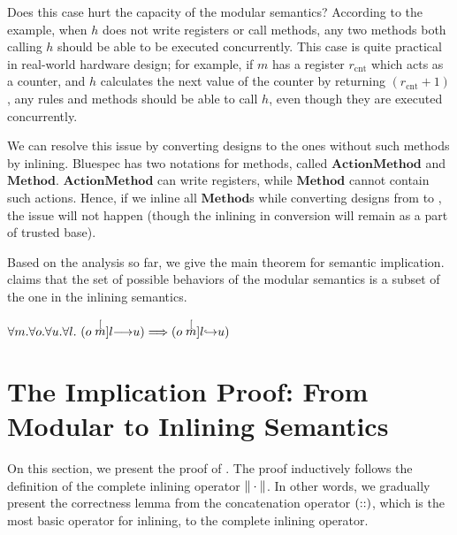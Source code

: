 Does this case hurt the capacity of the modular semantics? According
to the example, when $h$ does not write registers or call methods, any
two methods both calling $h$ should be able to be executed
concurrently. This case is quite practical in real-world hardware
design; for example, if $m$ has a register $r_{\textrm{cnt}}$ which
acts as a counter, and $h$ calculates the next value of the counter by
returning $(r_{\textrm{cnt}} + 1)$, any rules and methods should be
able to call $h$, even though they are executed concurrently.

We can resolve this issue by converting designs to the ones without
such methods by inlining. Bluespec has two notations for methods,
called $\textbf{ActionMethod}$ and
$\textbf{Method}$. $\textbf{ActionMethod}$ can write registers, while
$\textbf{Method}$ cannot contain such actions. Hence, if we inline all
$\textbf{Method}$s while converting designs from \Bluespec{} to
\Kami{}, the issue will not happen (though the inlining in conversion
will remain as a part of trusted base).

Based on the analysis so far, we give the main theorem for semantic
implication.  claims that the set of possible
behaviors of the modular semantics is a subset of the one in the
inlining semantics.

\begin{theorem}
  \label{thm-modtoinl}
  \mbox{}
  \begin{center}
    \begin{math}
      \forall m.\forall o.\forall u.\forall l.\ 
      (\semstep{m}{o}{u}{l}) \Longrightarrow (\semstepin{m}{o}{u}{l})
    \end{math}
  \end{center}
\end{theorem}

\section{The Implication Proof: From Modular to Inlining Semantics}

On this section, we present the proof of . The
proof inductively follows the definition of the complete inlining
operator $\| \cdot \|$. In other words, we gradually present the
correctness lemma from the concatenation operator $(::)$,
which is the most basic operator for inlining, to the complete
inlining operator.

